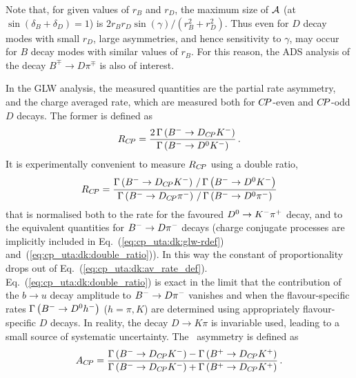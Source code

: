 Note that, for given values of $r_B$ and $r_D$, 
the maximum size of ${\cal A}$ (at $\sin \left( \delta_B + \delta_D \right) = 1$)
is $2 r_B r_D \sin \left( \gamma \right) / \left( r_B^2 + r_D^2 \right)$.
Thus even for $D$ decay modes with small $r_D$, 
large asymmetries, and hence sensitivity to $\gamma$, 
may occur for $B$ decay modes with similar values of $r_B$.
For this reason, the ADS analysis of the decay $B^\mp \to D \pi^\mp$ 
is also of interest.

In the GLW analysis, the measured quantities are the 
partial rate asymmetry, and the charge averaged rate,
which are measured both for $C\!P$-even and $C\!P$-odd $D$ decays.
The former is defined as 
\begin{equation}
  \label{eq:cp_uta:dk:glw-rdef}
  R_{C\!P} = 
  \frac{2 \, \Gamma \left( B^{-} \to D_{C\!P} K^-  \right)}
  {\Gamma\left( B^{-} \to D^0 K^- \right)} \, .
\end{equation}
It is experimentally convenient to measure $R_{C\!P}$ using a double ratio,
\begin{equation}
  \label{eq:cp_uta:dk:double_ratio}
  R_{C\!P} = 
  \frac{
    \Gamma\left( B^{-} \to D_{C\!P} K^-  \right) \, / \, \Gamma\left( B^{-} \to D^0 K^- \right)
  }{
    \Gamma\left( B^{-} \to D_{C\!P} \pi^- \right) \, / \, \Gamma\left( B^{-} \to D^0 \pi^- \right)
  }
\end{equation}
that is normalised both to the rate for the favoured $D^0 \to K^-\pi^+$ decay, 
and to the equivalent quantities for $B^{-} \to D\pi^-$ decays
(charge conjugate processes are implicitly included in 
Eq.~(\ref{eq:cp_uta:dk:glw-rdef}) and~(\ref{eq:cp_uta:dk:double_ratio})).
In this way the constant of proportionality drops out of 
Eq.~(\ref{eq:cp_uta:dk:av_rate_def}).
Eq.~(\ref{eq:cp_uta:dk:double_ratio}) is exact in the limit that the
contribution of the $b \to u$ decay amplitude to $B^{-} \to D \pi^-$ vanishes and
when the flavour-specific rates $\Gamma\left( B^{-} \to D^0 h^- \right)$ ($h =
\pi,K$) are determined using appropriately flavour-specific $D$ decays.
In reality, the decay $D \to K\pi$ is invariable used, leading to a small source of systematic uncertainty.
The \CP\ asymmetry is defined as
\begin{equation}
  \label{eq:cp_uta:dk:glw-adef}
  A_{C\!P} = \frac{
    \Gamma\left(B^{-}\to D_{C\!P}K^-\right) - \Gamma\left(B^{+}\to D_{C\!P}K^+\right)
  }{
    \Gamma\left(B^{-}\to D_{C\!P}K^-\right) + \Gamma\left(B^{+}\to D_{C\!P}K^+\right)
  } \, .
\end{equation}

